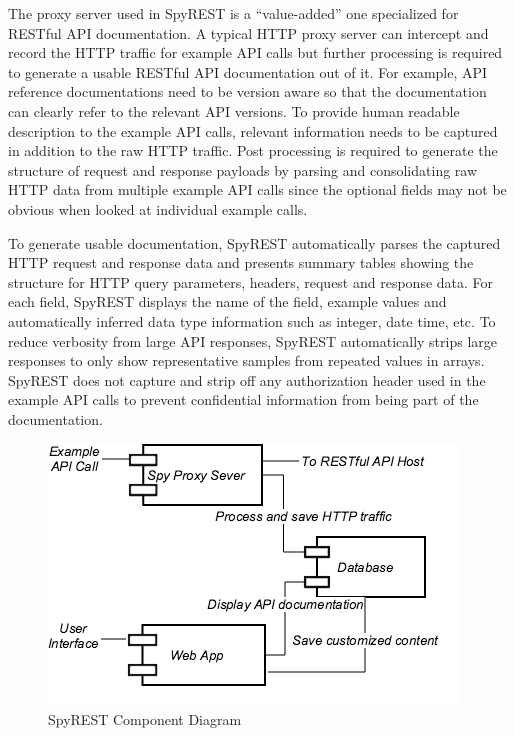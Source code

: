 \documentclass[conference]{IEEEtran}
\begin{document}
The proxy server used in SpyREST is a ``value-added'' one specialized for RESTful API documentation. A typical HTTP proxy server can intercept and record the HTTP traffic for example API calls but further processing is required to generate a usable RESTful API documentation out of it. For example, API reference documentations need to be version aware so that the documentation can clearly refer to the relevant API versions. To provide human readable description to the example API calls, relevant information needs to be captured in addition to the raw HTTP traffic. Post processing is required to generate the structure of request and response payloads by parsing and consolidating raw HTTP data from multiple example API calls since the optional fields may not be obvious when looked at individual example calls.

To generate usable documentation, SpyREST automatically parses the captured HTTP request and response data and presents summary tables showing the structure for HTTP query parameters, headers, request and response data. For each field, SpyREST displays the name of the field, example values and automatically inferred data type information such as integer, date time, etc. To reduce verbosity from large API responses, SpyREST automatically strips large responses to only show representative samples from repeated values in arrays. SpyREST does not capture and strip off any authorization header used in the example API calls to prevent confidential information from being part of the documentation.


\begin{figure}[tbh]
  \centering
  \includegraphics[width=\linewidth]{spyrest_components.png}
  \caption{SpyREST Component Diagram}
  \label{fig:components}
\end{figure}
\end{document}
